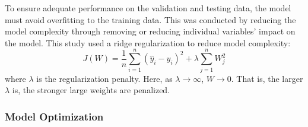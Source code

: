 To ensure adequate performance on the validation and testing data, the model must avoid overfitting to the training data.  This was conducted by reducing the model complexity through removing or reducing individual variables' impact on the model.  This study used a ridge regularization to reduce model complexity:
\begin{equation}
    J(W) = \frac{1}{n}\sum\limits^n_{i=1}(\hat{y}_i - y_i)^2 + \lambda \sum\limits^n_{j=1} W_j^2
    \label{eq:08MSE_wR}
\end{equation}
where $\lambda$ is the regularization penalty.  Here, as $\lambda \rightarrow \infty$, $W \rightarrow 0$.  That is, the larger $\lambda$ is, the stronger large weights are penalized. 

\subsubsection{Model Optimization}

